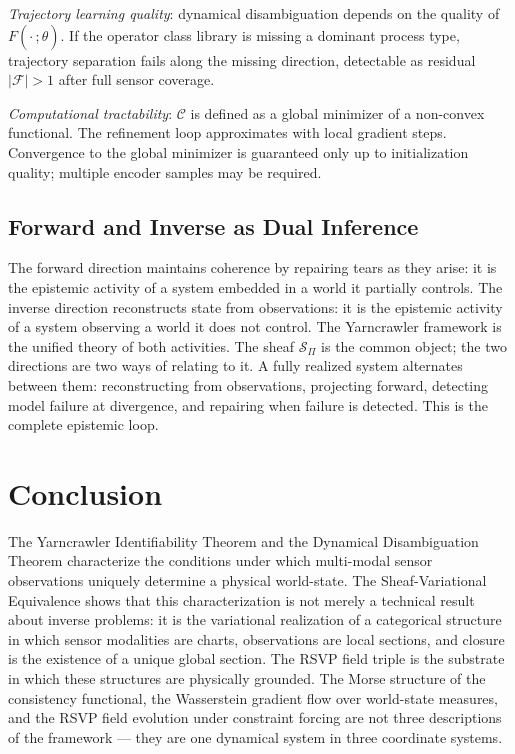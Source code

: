 \documentclass[12pt, oneside]{article}
\begin{document}
\emph{Trajectory learning quality}: dynamical disambiguation depends on the quality of
$F(\cdot\,;\hat{\theta})$. If the operator class library is missing a dominant process
type, trajectory separation fails along the missing direction, detectable as residual
$|\mathcal{F}| > 1$ after full sensor coverage.

\emph{Computational tractability}: $\mathcal{C}$ is defined as a global minimizer of a
non-convex functional. The refinement loop approximates with local gradient steps.
Convergence to the global minimizer is guaranteed only up to initialization quality;
multiple encoder samples may be required.

\subsection{Forward and Inverse as Dual Inference}

The forward direction maintains coherence by repairing tears as they arise: it is the
epistemic activity of a system embedded in a world it partially controls. The inverse
direction reconstructs state from observations: it is the epistemic activity of a system
observing a world it does not control. The Yarncrawler framework is the unified theory of
both activities. The sheaf $\mathcal{S}_\Pi$ is the common object; the two directions are
two ways of relating to it. A fully realized system alternates between them:
reconstructing from observations, projecting forward, detecting model failure at
divergence, and repairing when failure is detected. This is the complete epistemic loop.

\section{Conclusion}
\label{sec:conclusion}

The Yarncrawler Identifiability Theorem and the Dynamical Disambiguation Theorem
characterize the conditions under which multi-modal sensor observations uniquely determine
a physical world-state. The Sheaf-Variational Equivalence shows that this characterization
is not merely a technical result about inverse problems: it is the variational realization
of a categorical structure in which sensor modalities are charts, observations are local
sections, and closure is the existence of a unique global section. The RSVP field triple
is the substrate in which these structures are physically grounded. The Morse structure of
the consistency functional, the Wasserstein gradient flow over world-state measures, and
the RSVP field evolution under constraint forcing are not three descriptions of the
framework --- they are one dynamical system in three coordinate systems.
\end{document}
